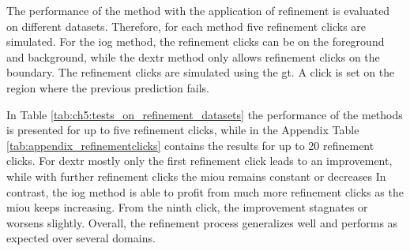 The performance of the method with the application of refinement is evaluated on different datasets.
Therefore, for each method five refinement clicks are simulated.
For the \gls{iog} method, the refinement clicks can be on the foreground and background, while the \gls{dextr} method only allows refinement clicks on the boundary.
The refinement clicks are simulated using the \gls{gt}.
A click is set on the region where the previous prediction fails.

\begin{table}[h!]
	\centering
	\caption[Generalization of IOG and DEXTR refinement]{
		Performance of the \gls{dextr} and \gls{iog} method for different number of refinement clicks.
		At $ n_{\textnormal{\textit{refine clicks}}} = 0 $, no refinement click is set, which is equivalent to the initial prediction.
	}\label{tab:ch5:tests_on_refinement_datasets}
\end{table}

In Table \ref{tab:ch5:tests_on_refinement_datasets} the performance of the methods is presented for up to five refinement clicks, while in the Appendix Table \ref{tab:appendix_refinementclicks} contains the results for up to 20 refinement clicks.
For \gls{dextr} mostly only the first refinement click leads to an improvement, while with further refinement clicks the \gls{miou} remains constant or decreases
In contrast, the \gls{iog} method is able to profit from much more refinement clicks as the \gls{miou} keeps increasing. 
From the ninth click, the improvement stagnates or worsens slightly.
Overall, the refinement process generalizes well and performs as expected over several domains.
